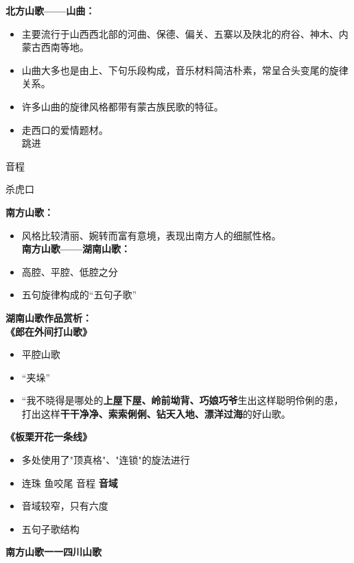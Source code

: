 \documentclass[
]{article}
\providecommand{\tightlist}{%
  \setlength{\itemsep}{0pt}\setlength{\parskip}{0pt}}
\begin{document}
\textbf{北方山歌------山曲：}

\begin{itemize}
\tightlist
\item
  主要流行于山西西北部的河曲、保德、偏关、五寨以及陕北的府谷、神木、内蒙古西南等地。
\item
  山曲大多也是由上、下句乐段构成，音乐材料简洁朴素，常呈合头变尾的旋律关系。
\item
  许多山曲的旋律风格都带有蒙古族民歌的特征。
\item
  走西口的爱情题材。\\
  跳进
\end{itemize}

音程

杀虎口

\textbf{南方山歌：}

\begin{itemize}
\tightlist
\item
  风格比较清丽、婉转而富有意境，表现出南方人的细腻性格。\\
  \textbf{南方山歌------湖南山歌：}
\item
  高腔、平腔、低腔之分
\item
  五句旋律构成的``五句子歌''
\end{itemize}

\textbf{湖南山歌作品赏析：}\\
\textbf{《郎在外间打山歌》}

\begin{itemize}
\tightlist
\item
  平腔山歌
\item
  ``夹垛''
\item
  ``我不晓得是哪处的\textbf{上屋下屋、岭前坳背、巧娘巧爷}生出这样聪明伶俐的患，打出这样\textbf{干干净净、索索俐俐、钻天入地、漂洋过海}的好山歌。
\end{itemize}

\textbf{《板栗开花一条线》}

\begin{itemize}
\tightlist
\item
  多处使用了"顶真格"、"连锁"的旋法进行
\item
  连珠 鱼咬尾 音程 \textbf{音域}
\item
  音域较窄，只有六度
\item
  五句子歌结构
\end{itemize}

\textbf{南方山歌一一四川山歌}
\end{document}
